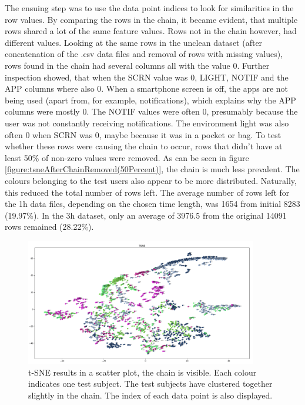 The ensuing step was to use the data point indices to look for similarities in the row values. By comparing the rows in the chain, it became evident, that multiple rows shared a lot of the same feature values. Rows not in the chain however, had different values. Looking at the same rows in the unclean dataset (after concatenation of the .csv data files and removal of rows with missing values), rows found in the chain had several columns all with the value 0. Further inspection showed, that when the SCRN value was 0, LIGHT, NOTIF and the APP columns where also 0. When a smartphone screen is off, the apps are not being used (apart from, for example, notifications), which explains why the APP columns were mostly 0. The NOTIF values were often 0, presumably because the user was not constantly receiving notifications. The environment light was also often 0 when SCRN was 0, maybe because it was in a pocket or bag. To test whether these rows were causing the chain to occur, rows that didn't have at least 50\% of non-zero values were removed. As can be seen in figure \ref{figure:tsneAfterChainRemoved(50Percent)}, the chain is much less prevalent. The colours belonging to the test users also appear to be more distributed. Naturally, this reduced the total number of rows left. The average number of rows left for the 1h data files, depending on the chosen time length, was 1654 from initial 8283 (19.97\%). In the 3h dataset, only an average of 3976.5 from the original 14091 rows remained (28.22\%).





\begin{figure}[h]
  \centering
  \includegraphics[width=0.9\textwidth]{./images/tsneTestSubjectsColor.png}
  \caption{t-SNE results in a scatter plot, the chain is visible. Each colour indicates one test subject. The test subjects have clustered together slightly in the chain. The index of each data point is also displayed.}
  \label{figure:tsneTestSubjectsColor}
\end{figure}

